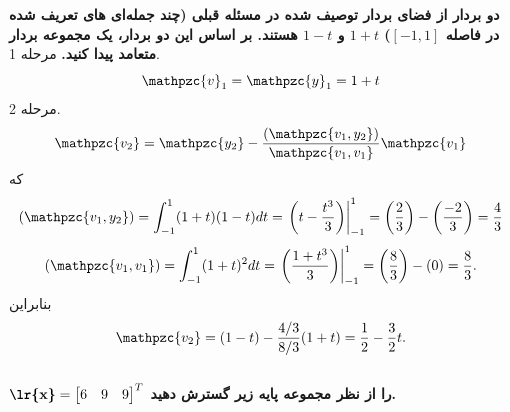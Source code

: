 \documentclass[a4paper,12pt]{report}
\begin{document}
         \hspace{-2cm}\textbf{}
         \textbf
         {
دو بردار از فضای بردار توصیف شده در مسئله قبلی (چند جمله‌ای های تعریف شده در فاصله
 $ [-1 , 1] $) 
  $ 1+t $ و
  $ 1-t $
   هستند. بر اساس این دو بردار، یک مجموعه بردار متعامد پیدا کنید.
         }
         مرحله 1.
         $$
         \mathpzc{v}_1=\mathpzc{y}_1=1+t
         $$
         مرحله 2.
         $$
         \mathpzc{v_2}=\mathpzc{y_2}-
         \frac{(\mathpzc{v_1,y_2})}
         {\mathpzc{v_1,v_1}}\mathpzc{v_1}
         $$
         که
         $$
         (\mathpzc{v_1,y_2})=
         \int_{-1}^{1}(1+t)(1-t)dt=\left. \left(t-\frac{t^3}{3}\right)\right|_{-1}^{1}=
         \left (\frac{2}{3}\right)-
         \left (\frac{-2}{3}\right)=\frac{4}{3}
         $$
         $$
         (\mathpzc{v_1,v_1})=
         \int_{-1}^{1}(1+t)^2dt=\left. \left(\frac{1+t^3}{3}\right)\right|_{-1}^{1}=
         \left (\frac{8}{3}\right)-
         (0)=\frac{8}{3}.
         $$
         بنابراین
         $$
         \mathpzc{v_2}=(1-t)-\frac{4/3}{8/3}(1+t)=\frac12-\frac32t.
         $$
         \\
         \hspace{-2cm}\textbf{}
         \textbf
         {
         	$ \textbf{\lr{x}}=
         	\begin{bmatrix}
         		6 & 9 & 9
         	\end{bmatrix}^T $
         	 را از نظر مجموعه پایه زیر گسترش دهید.
         }
     	 
\end{document}
